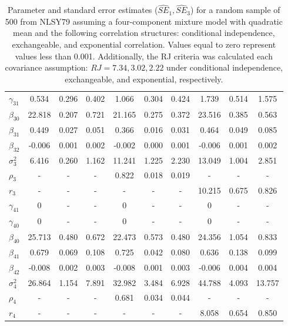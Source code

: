 \begin{table}[ht]
\begin{center}
\begin{tabular}{lccccccccc}
     $\gamma_{31}$ & 0.534 & 0.296 & 0.402 & 1.066 & 0.304 & 0.424 & 1.739 & 0.514 & 1.575 \\ 
     $\beta_{30}$ & 22.818 & 0.207 & 0.721 & 21.165 & 0.275 & 0.372 & 23.516 & 0.385 & 0.563 \\ 
     $\beta_{31}$ & 0.449 & 0.027 & 0.051 & 0.366 & 0.016 & 0.031 & 0.464 & 0.049 & 0.085 \\ 
     $\beta_{32}$ & -0.006 & 0.001 & 0.002 & -0.002 & 0.000 & 0.001 & -0.006 & 0.001 & 0.002 \\ 
     $\sigma_3^2$ & 6.416 & 0.260 & 1.162 & 11.241 & 1.225 & 2.230 & 13.049 & 1.004 & 2.851 \\ 
     $\rho_3$ & - & - & - & 0.822 & 0.018 & 0.019 & - & - & - \\ 
     $r_3$ & - & - & - & - & - & - & 10.215 & 0.675 & 0.826 \\ 
 $\gamma_{41}$ & 0 & - & - & 0 & - & - & 0 & - & - \\ 
     $\gamma_{40}$ & 0 & - & - & 0 & - & - & 0 & - & - \\ 
     $\beta_{40}$ & 25.713 & 0.480 & 0.672 & 22.473 & 0.573 & 0.480 & 24.356 & 1.054 & 0.833 \\ 
     $\beta_{41}$ & 0.679 & 0.069 & 0.108 & 0.725 & 0.042 & 0.080 & 0.636 & 0.138 & 0.099 \\ 
     $\beta_{42}$ & -0.008 & 0.002 & 0.003 & -0.008 & 0.001 & 0.003 & -0.006 & 0.004 & 0.004 \\ 
     $\sigma_4^2$ & 26.864 & 1.154 & 7.891 & 32.982 & 3.484 & 6.928 & 44.788 & 4.093 & 13.757 \\ 
     $\rho_4$ & - & - & - & 0.681 & 0.034 & 0.044 & - & - & - \\ 
     $r_4$ & - & - & - & - & - & - & 8.058 & 0.654 & 0.850 \\ 
   \hline\end{tabular}
\caption{Parameter and standard error estimates ($\widehat{SE}_{1},\widehat{SE}_{3}$) for a random sample of 500 from NLSY79 assuming a four-component mixture model with quadratic mean and the following correlation structures: conditional independence, exchangeable, and exponential correlation. Values equal to zero represent values less than 0.001. Additionally, the RJ criteria was calculated each covariance assumption: $RJ=7.34, 3.02, 2.22$ under conditional independence, exchangeable, and exponential, respectively.}
\label{tab:dat}
\end{center}
\end{table}


